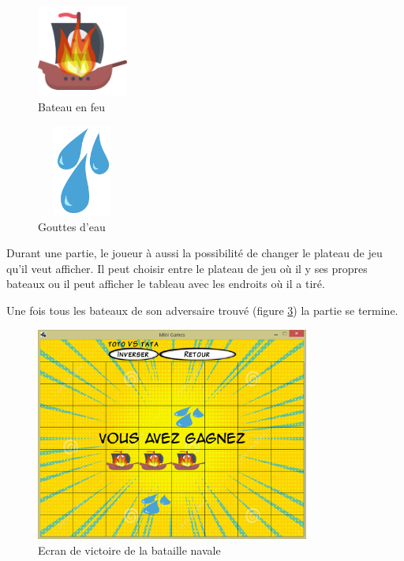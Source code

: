 \documentclass{report}
\begin{document}
\begin{figure}[H]
	\centering\includegraphics[width=3cm]{pirate-ship-dead}
	\caption{Bateau en feu}
	\label{shipInFire}
\end{figure}

\begin{figure}[H]
	\centering\includegraphics[width=3cm, height=3cm]{plouf}
	\caption{Gouttes d'eau}
	\label{tears}
\end{figure}

Durant une partie, le joueur à aussi la possibilité de changer le plateau de jeu qu'il veut afficher. Il peut choisir entre le plateau de jeu où il y ses propres bateaux ou
il peut afficher le tableau avec les endroits où il a tiré.\par{}
Une fois tous les bateaux de son adversaire trouvé (figure \ref{batailleWin}) la partie se termine.

\begin{figure}[H]
	\centering\includegraphics[width=9cm]{batailleWin}
	\caption{Ecran de victoire de la bataille navale}
	\label{batailleWin}
\end{figure}
\end{document}
